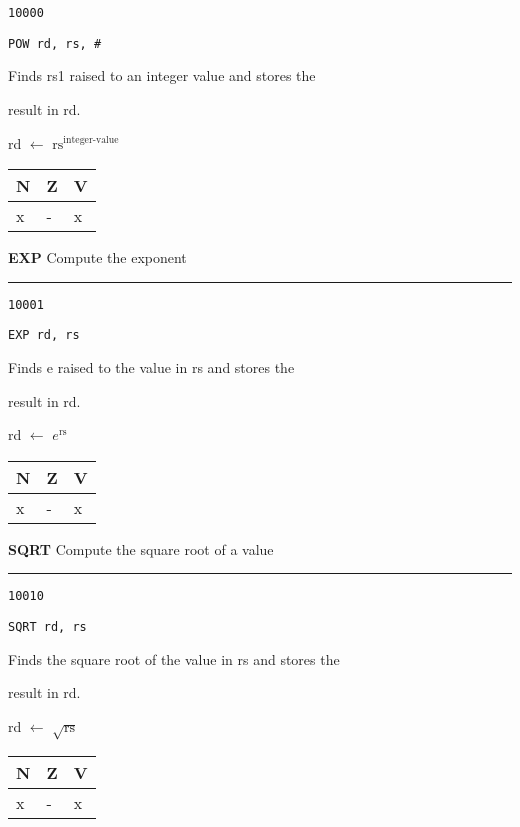 \documentclass{article}
\begin{document}
{\large
	 \texttt{10000} \par
	\smallbreak
	 \texttt{POW rd, rs, \#<integer-value>} \par
	\smallbreak
	 Finds rs1 raised to an integer value and stores the \par
	\makebox[3.5cm][l]{  } result in rd. \par
	\smallbreak
	 rd $\leftarrow$ $\textrm{rs}^{\textrm{integer-value}}$ \par
	\smallbreak
	 \begin{tabular}{lll} N \quad & Z \quad & V \\ \hline x & - & x \\ \end{tabular}
}

\bigskip\bigskip

\flushleft
\LARGE\textbf{EXP} \large \hfill Compute the exponent

\kern-3pt
\noindent\rule{16.5cm}{0.4pt}
\normalsize

{\large
	 \texttt{10001} \par
	\smallbreak
	 \texttt{EXP rd, rs} \par
	\smallbreak
	 Finds e raised to the value in rs and stores the \par
	\makebox[3.5cm][l]{  } result in rd. \par
	\smallbreak
	 rd $\leftarrow$ $e^{\textrm{rs}}$ \par
	\smallbreak
	 \begin{tabular}{lll} N \quad & Z \quad & V \\ \hline x & - & x \\ \end{tabular}
}

\pagebreak

\flushleft
\LARGE\textbf{SQRT} \large \hfill Compute the square root of a value

\kern-3pt
\noindent\rule{16.5cm}{0.4pt}
\normalsize

{\large
	 \texttt{10010} \par
	\smallbreak
	 \texttt{SQRT rd, rs} \par
	\smallbreak
	 Finds the square root of the value in rs and stores the\par
	\makebox[3.5cm][l]{  } result in rd. \par
	\smallbreak
	 rd $\leftarrow$ $\sqrt{\textrm{rs}}$ \par
	\smallbreak
	 \begin{tabular}{lll} N \quad & Z \quad & V \\ \hline x & - & x \\ \end{tabular}
}
\end{document}
